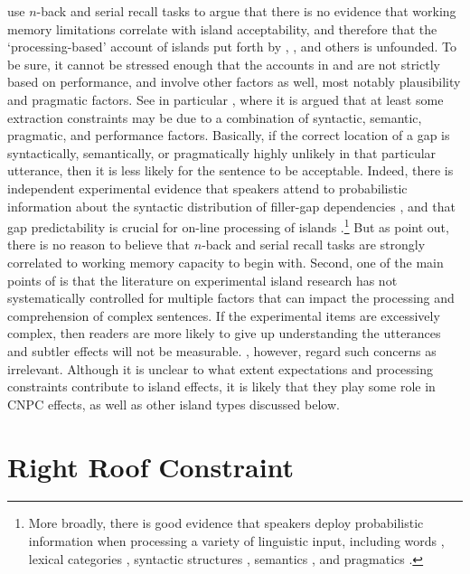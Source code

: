 \documentclass[output=paper
 	        ,biblatex
                ,babelshorthands
                ,newtxmath
                ,draftmode
                ,colorlinks, citecolor=brown
]{langscibook}
\begin{document}
  \citet{sprouse12} use $n$-back and serial recall tasks to argue that there is no evidence that working
  memory limitations correlate with island acceptability, and therefore that the `processing-based'
  account of islands put forth by  \citet{kluender92,kluender}, \citet{kluenderkustas}, \citet{hofsaglang} and others is unfounded. To be sure, it cannot be stressed enough that the accounts in \citet{kluender92} and \citet{hofsaglang} are  not strictly based on performance, and involve other factors as well, most notably plausibility and pragmatic factors. See in particular \citet[49]{hoflangreply}, where it is argued that at least some extraction constraints may be due to a combination of syntactic, semantic, pragmatic, and performance factors.  Basically, if the correct location of a gap is syntactically, semantically, or pragmatically highly unlikely in that particular utterance, then it is less likely for the sentence to be acceptable.  Indeed, there is independent experimental evidence that  speakers attend to  probabilistic information about the syntactic distribution of  filler-gap dependencies \citep{culcogsci},  and that gap  predictability  is crucial for on-line processing of islands \citep{michelt}.\footnote{More broadly, there is good  evidence that  speakers deploy probabilistic information when  processing a variety of linguistic input, including words \citep{altman99,arai,creel,delong,kutas84},  lexical categories \citep{gibson07,levy13,tabor97},  syntactic structures \citep{levyted,lau06,levy08,staub},  semantics \citep{altman99,federmeier,kamide03}, and pragmatics \citep{shankweiler,mak,roland12}.} But as \citet{reply2} point out, there is no reason to believe  that $n$-back and serial recall tasks are strongly correlated to working memory capacity to begin with. Second, one of the main points of \citet{hofsaglang} is that the literature  on experimental  island research has not systematically controlled for multiple factors that can impact the processing and comprehension of complex sentences. If the experimental items are excessively  complex, then readers are more likely to give up understanding the utterances and subtler effects  will not be measurable.  \citet{phil13}, however, regard such concerns as irrelevant.
    Although it is unclear to what extent expectations and processing constraints contribute to island effects, it is likely that they play some role in CNPC effects, as well as  other island types discussed below.


\section{Right Roof Constraint}
\end{document}

